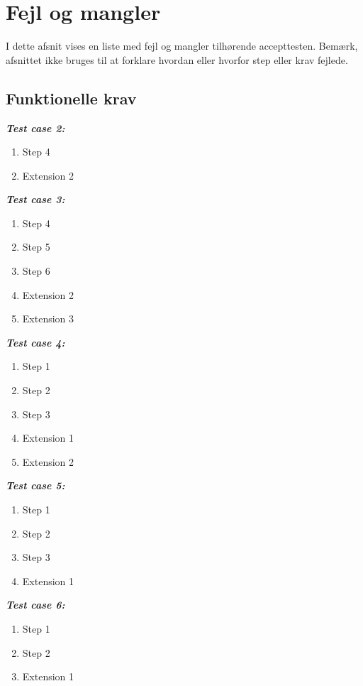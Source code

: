 \chapter{Fejl og mangler}

I dette afsnit vises en liste med fejl og mangler tilhørende accepttesten.  Bemærk, afsnittet ikke bruges til at forklare hvordan eller hvorfor step eller krav fejlede.   

\section{Funktionelle krav}

\textbf{\textit{Test case 2:} }
\begin{enumerate}
\item Step 4
\item Extension 2\\
\end{enumerate}

\textbf{\textit{Test case 3:} }
\begin{enumerate}
\item Step 4
\item Step 5
\item Step 6
\item Extension 2
\item Extension 3\\
\end{enumerate}

\textbf{\textit{Test case 4:} }
\begin{enumerate}
\item Step 1
\item Step 2
\item Step 3
\item Extension 1
\item Extension 2\\
\end{enumerate}

\textbf{\textit{Test case 5:} }
\begin{enumerate}
\item Step 1
\item Step 2
\item Step 3
\item Extension 1\\
\end{enumerate}	

\newpage

\textbf{\textit{Test case 6:} }
\begin{enumerate}
\item Step 1
\item Step 2
\item Extension 1\\
\end{enumerate}	


